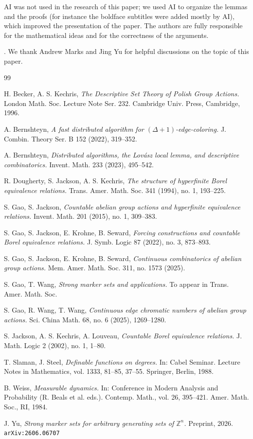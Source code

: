 \documentclass{amsart}
\theoremstyle{definition}
\newcommand{\Z}{\mathbb Z}
\begin{document}
 AI was not used in the research of this paper; we used AI to organize the lemmas and the proofs (for instance the boldface subtitles were added mostly by AI), which improved the presentation of the paper. The authors are fully responsible for the mathematical ideas and for the correctness of the arguments.

\medskip
{}. We thank Andrew Marks and Jing Yu for helpful discussions on the topic of this paper.

\begin{thebibliography}{99}

H. Becker, A. S. Kechris,
\textit{The Descriptive Set Theory of Polish Group Actions.}
London Math. Soc. Lecture Note Ser. 232. Cambridge Univ.
Press, Cambridge, 1996.

A. Bernshteyn, 
\textit{A fast distributed algorithm for $(\Delta+1)$-edge-coloring.} J. Combin. Theory Ser. B 152 (2022), 319--352.


A. Bernshteyn, 
\textit{Distributed algorithms, the Lov\'{a}sz local lemma, and descriptive combinatorics.} Invent. Math. 233 (2023), 495--542.


R. Dougherty, S. Jackson, A. S. Kechris,
\textit{The structure of hyperfinite Borel equivalence relations.}
Trans. Amer. Math. Soc. 341 (1994), no. 1, 193--225.

S. Gao, S. Jackson,
\textit{Countable abelian group actions and hyperfinite equivalence
relations.}
Invent. Math. 201 (2015), no. 1, 309--383.

S. Gao, S. Jackson, E. Krohne, B. Seward,
\textit{Forcing constructions and countable Borel equivalence relations.}
J. Symb. Logic 87 (2022), no. 3, 873--893.

S. Gao, S. Jackson, E. Krohne, B. Seward,
\textit{Continuous combinatorics of abelian group actions.}
Mem. Amer. Math. Soc. 311, no. 1573 (2025).

S. Gao, T. Wang,
\textit{Strong marker sets and applications.}
To appear in Trans. Amer. Math. Soc.

S. Gao, R. Wang, T. Wang,
\textit{Continuous edge chromatic numbers of abelian group actions.}
Sci. China Math. 68, no. 6  (2025), 1269–1280.

S. Jackson, A. S. Kechris, A. Louveau,
\textit{Countable Borel equivalence relations.}
J. Math. Logic 2 (2002), no. 1, 1--80.

T. Slaman, J. Steel,
\textit{Definable functions on degrees.}
In: Cabel Seminar. Lecture Notes in Mathematics, vol. 1333, 81--85,
37--55. Springer, Berlin, 1988.

B. Weiss,
\textit{Measurable dynamics.}
In: Conference in Modern Analysis and Probability (R. Beals et al. eds.).
Contemp. Math., vol. 26, 395--421. Amer. Math.
Soc., RI, 1984.


 J. Yu, \textit{Strong marker sets for arbitrary generating sets of $\Z^n$.} Preprint, 2026. {\tt arXiv:2606.06707}




\end{thebibliography}
\end{document}
